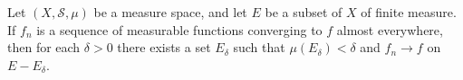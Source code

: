 \documentclass[12pt]{article}
\begin{document}
Let $(X,\mathcal{S},\mu)$ be a measure space, and let $E$ be a subset of $X$ of finite measure. If $f_n$ is a sequence of measurable functions converging to $f$ almost everywhere, then for each $\delta>0$ there exists a set $E_\delta$ such that $\mu(E_\delta)<\delta$ and $f_n\rightarrow f$  on $E-E_\delta$.
\end{document}
